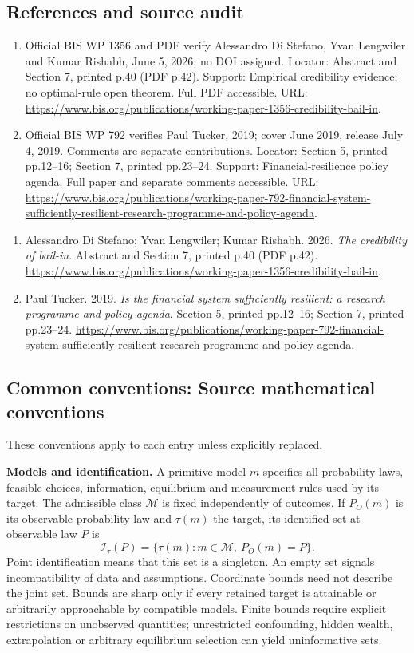\documentclass[11pt,a4paper]{article}
\begin{document}
\subsection*{References and source audit}
\begin{enumerate}
\item Official BIS WP 1356 and PDF verify Alessandro Di Stefano, Yvan Lengwiler and Kumar Rishabh, June 5, 2026; no DOI assigned. Locator: Abstract and Section 7, printed p.40 (PDF p.42). Support: Empirical credibility evidence; no optimal-rule open theorem. Full PDF accessible. URL: \url{https://www.bis.org/publications/working-paper-1356-credibility-bail-in}.
\item Official BIS WP 792 verifies Paul Tucker, 2019; cover June 2019, release July 4, 2019. Comments are separate contributions. Locator: Section 5, printed pp.12--16; Section 7, printed pp.23--24. Support: Financial-resilience policy agenda. Full paper and separate comments accessible. URL: \url{https://www.bis.org/publications/working-paper-792-financial-system-sufficiently-resilient-research-programme-and-policy-agenda}.
\end{enumerate}
\begin{enumerate}\raggedright
\item\hypertarget{definitions:source:30007609:1}{} Alessandro Di Stefano; Yvan Lengwiler; Kumar Rishabh. 2026. \emph{The credibility of bail-in}. Abstract and Section 7, printed p.40 (PDF p.42).
\url{https://www.bis.org/publications/working-paper-1356-credibility-bail-in}.
\item\hypertarget{definitions:source:30007609:2}{} Paul Tucker. 2019. \emph{Is the financial system sufficiently resilient: a research programme and policy agenda}. Section 5, printed pp.12--16; Section 7, printed pp.23--24.
\url{https://www.bis.org/publications/working-paper-792-financial-system-sufficiently-resilient-research-programme-and-policy-agenda}.
\end{enumerate}

\subsection*{Common conventions: Source mathematical conventions}

These conventions apply to each entry unless explicitly replaced.

\textbf{Models and identification.} A primitive model \(m\) specifies all probability laws, feasible choices, information, equilibrium and measurement rules used by its target. The admissible class \(\mathcal M\) is fixed independently of outcomes. If \(P_O(m)\) is its observable probability law and \(\tau(m)\) the target, its identified set at observable law \(P\) is
\[
 \mathcal I_\tau(P)=\{\tau(m):m\in\mathcal M,\ P_O(m)=P\}.
\]
Point identification means that this set is a singleton. An empty set signals incompatibility of data and assumptions. Coordinate bounds need not describe the joint set. Bounds are sharp only if every retained target is attainable or arbitrarily approachable by compatible models. Finite bounds require explicit restrictions on unobserved quantities; unrestricted confounding, hidden wealth, extrapolation or arbitrary equilibrium selection can yield uninformative sets.
\end{document}
